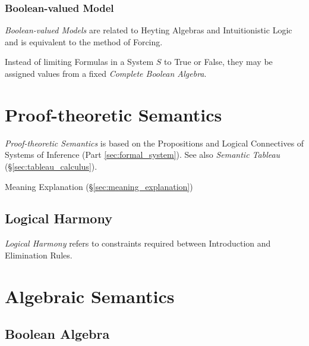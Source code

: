 \subsubsection{Boolean-valued Model}\label{sec:boolean_model}

\emph{Boolean-valued Models} are related to Heyting Algebras and
Intuitionistic Logic and is equivalent to the method of Forcing.

Instead of limiting Formulas in a System $S$ to True or False, they
may be assigned values from a fixed \emph{Complete Boolean Algebra}.



\section{Proof-theoretic Semantics}\label{sec:proof_semantics}

\emph{Proof-theoretic Semantics} is based on the Propositions and
Logical Connectives of Systems of Inference (Part
\ref{sec:formal_system}). See also \emph{Semantic Tableau}
(\S\ref{sec:tableau_calculus}).

Meaning Explanation (\S\ref{sec:meaning_explanation})



\subsection{Logical Harmony} \label{sec:logical_harmony}

\emph{Logical Harmony} refers to constraints required between
Introduction and Elimination Rules.



\section{Algebraic Semantics}\label{sec:algebraic_semantics}

\subsection{Boolean Algebra}\label{sec:boolean_algebra}

